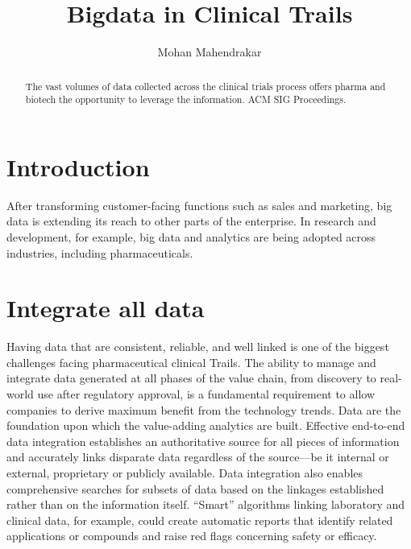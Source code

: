 \documentclass[sigconf]{acmart}
\begin{document}
\title{Bigdata in Clinical Trails}


\author{Mohan Mahendrakar}

\renewcommand{\shortauthors}{B. Trovato et al.}


\begin{abstract}
The vast volumes of data collected across the clinical trials process offers pharma and biotech 
the opportunity to leverage the information.
ACM SIG Proceedings.
\end{abstract}



\maketitle

\section{Introduction}

After transforming customer-facing functions such as sales and marketing, big data is extending its reach to other parts of the enterprise. In research and development, for example, big data and analytics are being adopted across industries, including pharmaceuticals.

\section{Integrate all data}

Having data that are consistent, reliable, and well linked is one of the biggest challenges facing pharmaceutical clinical Trails. The ability to manage and integrate data generated at all phases of the value chain, from discovery to real-world use after regulatory approval, is a fundamental requirement to allow companies to derive maximum benefit from the technology trends. Data are the foundation upon which the value-adding analytics are built. Effective end-to-end data integration establishes an authoritative source for all pieces of information and accurately links disparate data regardless of the source—be it internal or external, proprietary or publicly available. Data integration also enables comprehensive searches for subsets of data based on the linkages established rather than on the information itself. “Smart” algorithms linking laboratory and clinical data, for example, could create automatic reports that identify related applications or compounds and raise red flags concerning safety or efficacy.
\end{document}
